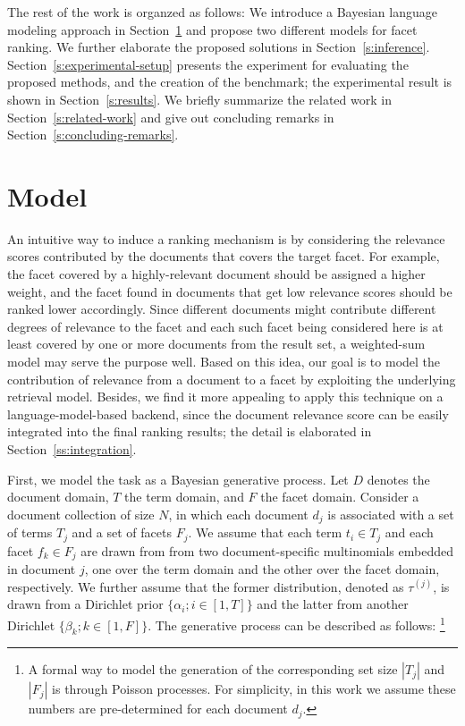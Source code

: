 The rest of the work is organzed as follows: We introduce a Bayesian language
modeling approach in Section~\ref{s:model} and propose two different models for
facet ranking.  We further elaborate the proposed solutions in
Section~\ref{s:inference}.  Section~\ref{s:experimental-setup} presents the
experiment for evaluating the proposed methods, and the creation of the
benchmark; the experimental result is shown in Section~\ref{s:results}.  We
briefly summarize the related work in Section~\ref{s:related-work} and give out
concluding remarks in Section~\ref{s:concluding-remarks}.

\section{Model}\label{s:model}

An intuitive way to induce a ranking mechanism is by considering the relevance
scores contributed by the documents that covers the target facet.  For example,
the facet covered by a highly-relevant document should be assigned a higher
weight, and the facet found in documents that get low relevance scores should
be ranked lower accordingly.  Since different documents might contribute
different degrees of relevance to the facet and each such facet being
considered here is at least covered by one or more documents from the result
set, a weighted-sum model may serve the purpose well.  Based on this idea, our
goal is to model the contribution of relevance from a document to a facet by
exploiting the underlying retrieval model.  Besides, we find it more appealing
to apply this technique on a language-model-based backend, since the document
relevance score can be easily integrated into the final ranking results; the
detail is elaborated in Section~\ref{ss:integration}.

First, we model the task as a Bayesian generative process.  Let $D$ denotes the
document domain, $T$ the term domain, and $F$ the facet domain.  Consider a
document collection of size $N$, in which each document $d_j$ is associated
with a set of terms $T_j$ and a set of facets $F_j$.  We assume that each term
$t_i \in T_j$ and each facet $f_k \in F_j$ are drawn from from two
document-specific multinomials embedded in document $j$, one over the term
domain and the other over the facet domain, respectively.  We further assume
that the former distribution, denoted as $\tau^{(j)}$, is drawn from a
Dirichlet prior $\{ \alpha_i; i \in [1, T] \}$ and the latter from another
Dirichlet $\{ \beta_k; k \in [1, F] \}$.  The generative process can be
described as follows: \footnote{A formal way to model the generation of the
corresponding set size $|T_j|$ and $|F_j|$ is through Poisson processes.  For
simplicity, in this work we assume these numbers are pre-determined for each
document $d_j$.} 

